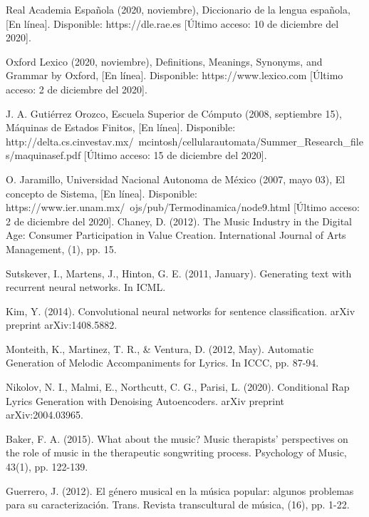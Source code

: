 \documentclass[12pt, a4paper, titlepage]{report}
\begin{document}
\begin{thebibliography}{20}
	Real Academia Española (2020, noviembre), Diccionario de la lengua española, [En línea]. Disponible: https://dle.rae.es [Último acceso: 10 de diciembre del 2020].
	
	Oxford Lexico (2020, noviembre), Definitions, Meanings, Synonyms, and Grammar by Oxford, [En línea]. Disponible: https://www.lexico.com [Último acceso: 2 de diciembre del 2020].
	
	J. A. Gutiérrez Orozco, Escuela Superior de Cómputo (2008, septiembre 15), Máquinas de Estados Finitos, [En línea]. Disponible: http://delta.cs.cinvestav.mx/~mcintosh/cellularautomata/Summer\_Research\_files/maquinasef.pdf [Último acceso: 15 de diciembre del 2020].
	
	O. Jaramillo, Universidad Nacional Autonoma de México (2007, mayo 03), El concepto de Sistema, [En línea]. Disponible: https://www.ier.unam.mx/~ojs/pub/Termodinamica/node9.html [Último acceso: 2 de diciembre del 2020].
	Chaney, D. (2012). The Music Industry in the Digital Age: Consumer Participation in Value Creation. International Journal of Arts Management, (1), pp. 15.
	
	Sutskever, I., Martens, J., Hinton, G. E. (2011, January). Generating text with recurrent neural networks. In ICML.
	
	Kim, Y. (2014). Convolutional neural networks for sentence classification. arXiv preprint arXiv:1408.5882.
	
	Monteith, K., Martinez, T. R., \& Ventura, D. (2012, May). Automatic Generation of Melodic Accompaniments for Lyrics. In ICCC, pp. 87-94.
	
	Nikolov, N. I., Malmi, E., Northcutt, C. G., Parisi, L. (2020). Conditional Rap Lyrics Generation with Denoising Autoencoders. arXiv preprint arXiv:2004.03965.
	
	Baker, F. A. (2015). What about the music? Music therapists’ perspectives on the role of music in the therapeutic songwriting process. Psychology of Music, 43(1), pp. 122-139.
	
	Guerrero, J. (2012). El género musical en la música popular: algunos problemas para su caracterización. Trans. Revista transcultural de música, (16), pp. 1-22.
	

\end{thebibliography}
\end{document}
